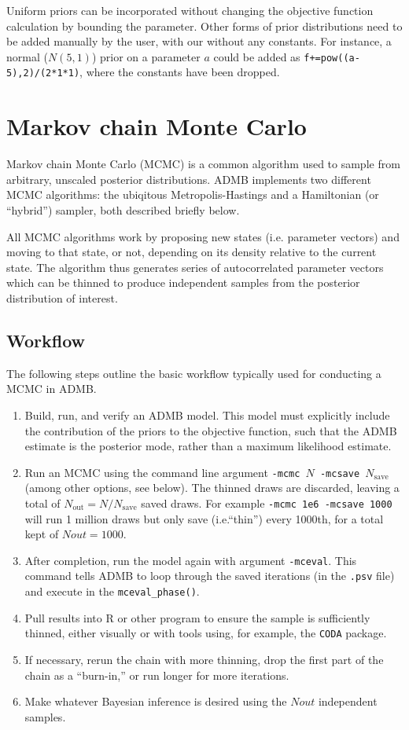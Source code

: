 \documentclass{article}\usepackage[]{graphicx}\usepackage[]{color}
\begin{document}
Uniform priors can be incorporated without changing the
objective function calculation by bounding the
parameter. Other forms of prior distributions need to be
added manually by the user, with our without any
constants. For instance, a normal ($N(5,1)$) prior on a
parameter $a$ could be added as
\texttt{f+=pow((a-5),2)/(2*1*1)}, where the constants have
been dropped.

\section{Markov chain Monte Carlo}
Markov chain Monte Carlo (MCMC) is a common algorithm used
to sample from arbitrary, unscaled posterior
distributions. ADMB implements two different MCMC
algorithms: the ubiqitous Metropolis-Hastings and a
Hamiltonian (or ``hybrid'') sampler, both described briefly
below.

All MCMC algorithms work by proposing new states
(i.e. parameter vectors) and moving to that state, or not,
depending on its density relative to the current state. The
algorithm thus generates series of autocorrelated parameter
vectors which can be thinned to produce independent samples
from the posterior distribution of interest.

\subsection{Workflow}
The following steps outline the basic workflow typically
used for conducting a MCMC in ADMB.
\begin{enumerate}
\item Build, run, and verify an ADMB model. This model must
  explicitly include the contribution of the priors to the
  objective function, such that the ADMB estimate is the
  posterior mode, rather than a maximum likelihood estimate.
\item Run an MCMC using the command line argument
  \texttt{-mcmc $N$ -mcsave $N_{\text{save}}$} (among other
  options, see below). The thinned draws are discarded,
  leaving a total of $N_{\text{out}}=N/N_{\text{save}}$
  saved draws. For example \texttt{-mcmc 1e6 -mcsave 1000}
  will run 1 million draws but only save (i.e.``thin'')
  every 1000th, for a total kept of $Nout=1000$.
\item After completion, run the model again with argument
  \texttt{-mceval}. This command tells ADMB to loop through
  the saved iterations (in the \texttt{.psv} file) and
  execute in the \texttt{mceval\_phase()}.
\item Pull results into R or other program to ensure the
  sample is sufficiently thinned, either visually or with
  tools using, for example, the \texttt{CODA} package.
\item If necessary, rerun the chain with more thinning, drop
  the first part of the chain as a ``burn-in,'' or run
  longer for more iterations.
\item Make whatever Bayesian inference is desired using the
  $Nout$ independent samples.
\end{enumerate}
\end{document}
